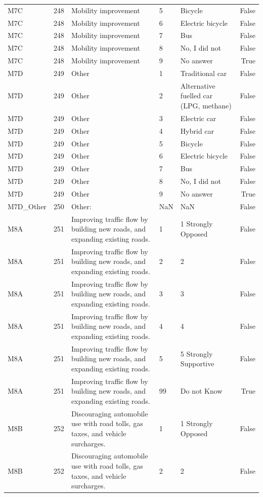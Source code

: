 \begin{tabular}{lrlllr}
M7C & 248 & Mobility improvement & 5 & Bicycle & False \\
M7C & 248 & Mobility improvement & 6 & Electric bicycle & False \\
M7C & 248 & Mobility improvement & 7 & Bus & False \\
M7C & 248 & Mobility improvement & 8 & No, I did not & False \\
M7C & 248 & Mobility improvement & 9 & No answer & True \\
M7D & 249 & Other & 1 & Traditional car & False \\
M7D & 249 & Other & 2 & Alternative fuelled car (LPG, methane) & False \\
M7D & 249 & Other & 3 & Electric car & False \\
M7D & 249 & Other & 4 & Hybrid car & False \\
M7D & 249 & Other & 5 & Bicycle & False \\
M7D & 249 & Other & 6 & Electric bicycle & False \\
M7D & 249 & Other & 7 & Bus & False \\
M7D & 249 & Other & 8 & No, I did not & False \\
M7D & 249 & Other & 9 & No answer & True \\
M7D_Other & 250 & Other: & NaN & NaN & False \\
M8A & 251 & Improving traffic flow by building new roads, and expanding existing roads. & 1 & 1 Strongly Opposed & False \\
M8A & 251 & Improving traffic flow by building new roads, and expanding existing roads. & 2 & 2 & False \\
M8A & 251 & Improving traffic flow by building new roads, and expanding existing roads. & 3 & 3 & False \\
M8A & 251 & Improving traffic flow by building new roads, and expanding existing roads. & 4 & 4 & False \\
M8A & 251 & Improving traffic flow by building new roads, and expanding existing roads. & 5 & 5 Strongly Supportive & False \\
M8A & 251 & Improving traffic flow by building new roads, and expanding existing roads. & 99 & Do not Know & True \\
M8B & 252 & Discouraging automobile use with road tolls, gas taxes, and vehicle surcharges. & 1 & 1 Strongly Opposed & False \\
M8B & 252 & Discouraging automobile use with road tolls, gas taxes, and vehicle surcharges. & 2 & 2 & False \\

\end{tabular}
